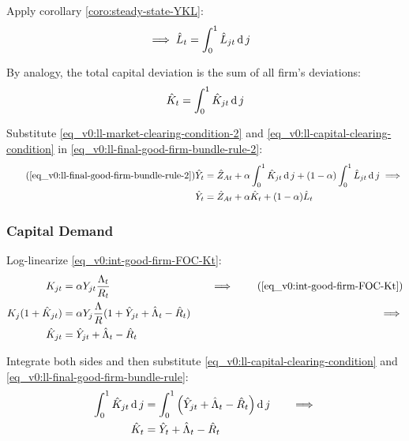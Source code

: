 \documentclass[../thesis.tex]{subfiles}
\begin{document}
	Apply corollary \ref{coro:steady-state-YKL}:
	\begin{align}
		\implies \hat{L}_t &= \int_{0}^{1} \hat{L}_{jt} \operatorname{d} j \label{eq_v0:ll-market-clearing-condition-2}
	\end{align}
	
	By analogy, the total capital deviation is the sum of all firm's deviations:
	\begin{align}
		\hat{K}_t = \int_{0}^{1} \hat{K}_{jt} \operatorname{d} j \label{eq_v0:ll-capital-clearing-condition}
	\end{align}
	
	Substitute \ref{eq_v0:ll-market-clearing-condition-2} and \ref{eq_v0:ll-capital-clearing-condition} in \ref{eq_v0:ll-final-good-firm-bundle-rule-2}:
	\begin{align}
		\tag{\ref{eq_v0:ll-final-good-firm-bundle-rule-2}}
		\hat{Y}_t &= \hat{Z}_{At} + \alpha \int_{0}^{1} \hat{K}_{jt} \dif j + (1-\alpha) \int_{0}^{1} \hat{L}_{jt} \dif j \implies \\
		\hat{Y}_t &= \hat{Z}_{At} + \alpha \hat{K}_t + (1-\alpha) \hat{L}_t \label{eq_v0:ll-final-good-firm-bundle-rule-3}
	\end{align}
	
	
	\subsubsection*{Capital Demand}
	
	Log-linearize \ref{eq_v0:int-good-firm-FOC-Kt}:
	\begin{alignat}{2}
		K_{jt} &= \alpha Y_{jt} \frac{\Lambda_t}{R_t} &\implies \tag{\ref{eq_v0:int-good-firm-FOC-Kt}} \\
		K_j (1+ \hat{K}_{jt}) &= \alpha Y_{j} \frac{\Lambda}{R} (1+ \hat{Y}_{jt} + \hat{\Lambda}_t - \hat{R}_t) \quad &\implies \nonumber \\
		\hat{K}_{jt} &= \hat{Y}_{jt} + \hat{\Lambda}_t - \hat{R}_t \nonumber
	\end{alignat}
	
	Integrate both sides and then substitute \ref{eq_v0:ll-capital-clearing-condition} and \ref{eq_v0:ll-final-good-firm-bundle-rule}:
	\begin{alignat}{2}
		\int_{0}^{1} \hat{K}_{jt} \operatorname{d} j &= \int_{0}^{1} \left( \hat{Y}_{jt} + \hat{\Lambda}_t - \hat{R}_t \right) \operatorname{d} j \quad &\implies \nonumber \\
		\hat{K}_t &= \hat{Y}_t + \hat{\Lambda}_t - \hat{R}_t \label{eq_v0:ll-int-good-firm-FOC-Kt}
	\end{alignat}
	
\end{document}
